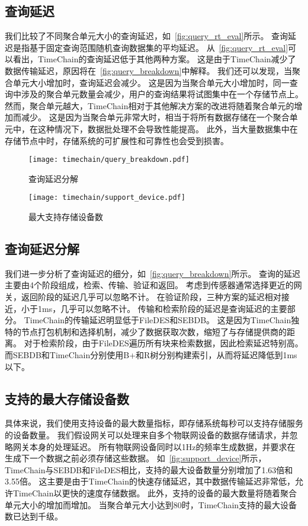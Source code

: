 \subsection{查询延迟}
我们比较了不同聚合单元大小的查询延迟，如~\autoref{fig:query_rt_eval}所示。
查询延迟是指基于固定查询范围随机查询数据集的平均延迟。
从~\autoref{fig:query_rt_eval}可以看出，TimeChain的查询延迟低于其他两种方案。
这是由于TimeChain减少了数据传输延迟，原因将在~\autoref{fig:query_breakdown}中解释。
我们还可以发现，当聚合单元大小增加时，查询延迟会减少。
这是因为当聚合单元大小增加时，同一查询中涉及的聚合单元数量会减少，用户的查询结果将试图集中在一个存储节点上。
然而，聚合单元越大，TimeChain相对于其他解决方案的改进将随着聚合单元的增加而减少。
这是因为当聚合单元非常大时，相当于将所有数据存储在一个聚合单元中，在这种情况下，数据批处理不会导致性能提高。
此外，当大量数据集中在存储节点中时，存储系统的可扩展性和可靠性也会受到损害。

\begin{figure*}[t]
    \centering
    \begin{minipage}{0.48\linewidth}
        \centering
        \texttt{[image: timechain/query\_breakdown.pdf]}
        \caption{查询延迟分解}
        \label{fig:query_breakdown}
	\end{minipage}
	\quad
	\begin{minipage}{0.48\linewidth}
        \centering
        \texttt{[image: timechain/support\_device.pdf]}
        \caption{最大支持存储设备数}
        \label{fig:support_device}
    \end{minipage}
\end{figure*}

\subsection{查询延迟分解}
我们进一步分析了查询延迟的细分，如~\autoref{fig:query_breakdown}所示。
查询的延迟主要由4个阶段组成，检索、传输、验证和返回。
考虑到传感器通常选择更近的网关，返回阶段的延迟几乎可以忽略不计。
在验证阶段，三种方案的延迟相对接近，小于1ms，几乎可以忽略不计。
传输和检索阶段的延迟是查询延迟的主要部分。
TimeChain的传输延迟明显低于FileDES和SEBDB。
这是因为TimeChain独特的节点打包机制和选择机制，减少了数据获取次数，缩短了与存储提供商的距离。
对于检索阶段，由于FileDES遍历所有块来检索数据，因此检索延迟特别高。
而SEBDB和TimeChain分别使用B+和R树分别构建索引，从而将延迟降低到1ms以下。

\subsection{支持的最大存储设备数}
具体来说，我们使用支持设备的最大数量指标，即存储系统每秒可以支持存储服务的设备数量。
我们假设网关可以处理来自多个物联网设备的数据存储请求，并忽略网关本身的处理延迟。
所有物联网设备同时以1Hz的频率生成数据，并要求在生成下一个数据之前必须存储这些数据。
如~\autoref{fig:support_device}所示，TimeChain与SEBDB和FileDES相比，支持的最大设备数量分别增加了1.63倍和3.55倍。
这主要是由于TimeChain的快速存储延迟，其中数据传输延迟非常低，允许TimeChain以更快的速度存储数据。
此外，支持的设备的最大数量将随着聚合单元大小的增加而增加。
当聚合单元大小达到80时，TimeChain支持的最大设备数已达到千级。

